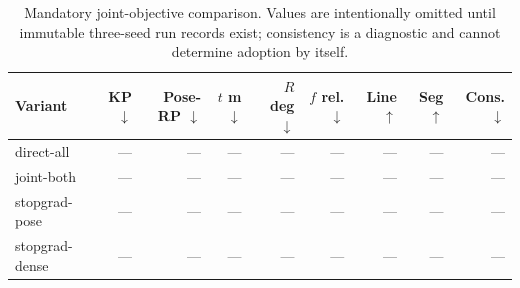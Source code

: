 \begin{table}[h]
  \centering
  \caption{Mandatory joint-objective comparison.  Values are intentionally
  omitted until immutable three-seed run records exist; consistency is a
  diagnostic and cannot determine adoption by itself.}
  \label{tab:result_template}
  \scriptsize
  \begin{tabular}{@{}lrrrrrrrr@{}}
    \toprule
    Variant & KP $\downarrow$ & Pose-RP $\downarrow$ & $t$ m $\downarrow$ &
    $R$ deg $\downarrow$ & $f$ rel. $\downarrow$ & Line $\uparrow$ &
    Seg $\uparrow$ & Cons. $\downarrow$ \\
    \midrule
    direct-all & --- & --- & --- & --- & --- & --- & --- & --- \\
    joint-both & --- & --- & --- & --- & --- & --- & --- & --- \\
    stopgrad-pose & --- & --- & --- & --- & --- & --- & --- & --- \\
    stopgrad-dense & --- & --- & --- & --- & --- & --- & --- & --- \\
    \bottomrule
  \end{tabular}
\end{table}

